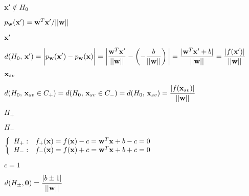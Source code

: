 \documentclass{article}
\def\lthtmlcheckvsize{\ifdim\ht\sizebox<\vsize 
  \ifdim\wd\sizebox<\hsize\expandafter\hfill\fi \expandafter\vfill
  \else\expandafter\vss\fi}%
\begin{document}
{\newpage\clearpage
{}%
$ {\bf x}'\notin H_0$%
\lthtmlindisplaymathZ
\lthtmlcheckvsize\clearpage}

{\newpage\clearpage
{}%
$ p_{\bf w}({\bf x}')={\bf w}^T{\bf x}'/||{\bf w}||$%
\lthtmlindisplaymathZ
\lthtmlcheckvsize\clearpage}

{\newpage\clearpage
{}%
$ {\bf x}'$%
\lthtmlindisplaymathZ
\lthtmlcheckvsize\clearpage}

{\newpage\clearpage
{}%
$\displaystyle d(H_0,\,{\bf x}')=\bigg| p_{\bf w}({\bf x}')-p_{\bf w}({\bf x}) \bigg|
=\bigg|\frac{{\bf w}^T{\bf x}'}{||{\bf w}||}-\left(-\frac{b}{||{\bf w}||}\right)\bigg|
=\frac{|{\bf w}^T{\bf x}'+b|}{||{\bf w}||}
=\frac{|f({\bf x}')|}{||{\bf w}||}$%
\lthtmlindisplaymathZ
\lthtmlcheckvsize\clearpage}

{\newpage\clearpage
{}%
$ {\bf x}_{sv}$%
\lthtmlindisplaymathZ
\lthtmlcheckvsize\clearpage}

{\newpage\clearpage
{}%
$\displaystyle d(H_0,\,{\bf x}_{sv}\in C_+)=d(H_0,\,{\bf x}_{sv}\in C_-)
=d(H_0,\,{\bf x}_{sv})=\frac{|f({\bf x}_{sv})|}{||{\bf w}||}$%
\lthtmlindisplaymathZ
\lthtmlcheckvsize\clearpage}

{\newpage\clearpage
{}%
$ H_+$%
\lthtmlindisplaymathZ
\lthtmlcheckvsize\clearpage}

{\newpage\clearpage
{}%
$ H_-$%
\lthtmlindisplaymathZ
\lthtmlcheckvsize\clearpage}

{\newpage\clearpage
{}%
$\displaystyle \left\{\begin{array}{ll}
H_+: & f_+({\bf x})=f({\bf x})-c={\bf w}^T {\bf x}+b-c=0 \\
H_-: & f_-({\bf x})=f({\bf x})+c={\bf w}^T {\bf x}+b+c=0
\end{array}\right.$%
\lthtmlindisplaymathZ
\lthtmlcheckvsize\clearpage}

{\newpage\clearpage
{}%
$ c=1$%
\lthtmlindisplaymathZ
\lthtmlcheckvsize\clearpage}

{\newpage\clearpage
{}%
$\displaystyle d(H_{\pm},{\bf0})=\frac{|b\pm 1|}{||{\bf w}||}$%
\lthtmlindisplaymathZ
\lthtmlcheckvsize\clearpage}
\end{document}
